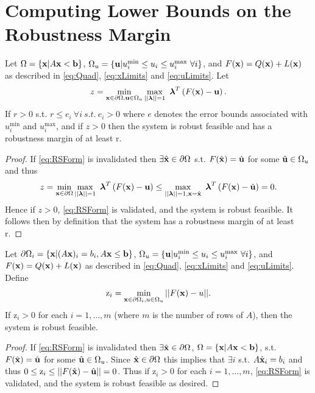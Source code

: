 \section{Computing Lower Bounds on the Robustness Margin} \label{sec:inbdform}  

\begin{thm}
Let $\Omega=\{\mathbf{x}| A\mathbf{x}< \mathbf{b}\}$, $\Omega_{u}=\{\mathbf{u}| u^{\min}_i\leq u_i \leq u^{\max}_i \ \forall i \}$, and $F(\mathbf{x})=Q(\mathbf{x})+L(\mathbf{x})$ as described in \cref{eq:Quad}, \cref{eq:xLimits} and \cref{eq:uLimits}. 
Let
$$z = \min\limits_{\vx\in \partial \Omega, \vu\in \Omega_{u} }\max\limits_{||\boldsymbol{\lambda}||=1}\ \boldsymbol{\lambda}^T\left(F(\vx)-\vu\right).$$
If $r>0$ s.t. $r\leq e_i \ \forall i \ s.t. \ e_i>0$ where $e$ denotes the error bounds associated with $ u^{\min}_i$ and $ u^{\max}_i$, and if $z>0$ then the system is robust feasible and has a robustness margin of at least r.

\begin{proof} 
If \cref{eq:RSForm} is invalidated then $\exists \hat{\mathbf{x}}\in\partial\Omega$ s.t. $F(\hat{\mathbf{x}})=\hat{\mathbf{u}}$ for some $\hat{\mathbf{u}}\in\Omega_{u}$ and thus $$z = \min\limits_{\vx\in \partial \Omega}\max\limits_{||\boldsymbol{\lambda}||=1}\ \boldsymbol{\lambda}^T\left(F(\vx)-\vu\right)\leq \max\limits_{||\boldsymbol{\lambda}||=1, \vx=\hat{\vx}}\ \boldsymbol{\lambda}^T\left(F(\vx)-\hat{\vu}\right)=0.$$ 
Hence if $z>0$, \cref{eq:RSForm} is validated, and the system is robust feasible. It follows then by definition that the system has a robustness margin of at least r.
\end{proof}
\end{thm}

\begin{thm} \label{thm:RobFeas}
Let $\partial\Omega_i=\{\mathbf{x}| (A\mathbf{x})_i = b_i, A\mathbf{x}\leq \mathbf{b}\}$, $\Omega_{u}=\{\mathbf{u}| u^{\min}_i\leq u_i \leq u^{\max}_i \ \forall i \}$, and $F(\mathbf{x})=Q(\mathbf{x})+L(\mathbf{x})$ as described in \cref{eq:Quad}, \cref{eq:xLimits} and \cref{eq:uLimits}. Define
\begin{align}
\mathrm{z}_i =  \min_{\mathbf{x}\in\partial\Omega_i, u\in \Omega_u} ||F(\mathbf{x})-u||. \label{eq:OPTfeas}
\end{align}
If $\mathrm{z}_i>0$ for each $i = 1, \ldots, m$ (where $m$ is the number of rows of $A$), then the system is robust feasible.

\begin{proof} 
If \cref{eq:RSForm} is invalidated then $\exists \hat{\mathbf{x}}\in\partial\Omega$, $\Omega=\{\mathbf{x}| A\mathbf{x}< \mathbf{b}\}$, s.t. $F(\hat{\mathbf{x}})=\hat{\mathbf{u}}$ for some $\hat{\mathbf{u}}\in \Omega_u$. 
Since $\hat{\mathbf{x}}\in\partial\Omega$ this implies that $\exists i$ s.t. $A\hat{\mathbf{x}}_i=b_i$ and thus $0\leq \mathrm{z}_i \leq ||F(\hat{\mathbf{x}})-\hat{\mathbf{u}}||=0$.
Thus if $\mathrm{z}_i>0$ for each $i = 1, \ldots, m$, \cref{eq:RSForm} is validated, and the system is robust feasible as desired.
\end{proof}
\end{thm}

